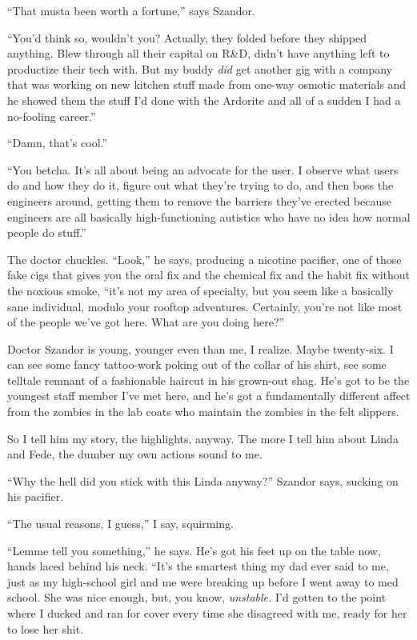 “That musta been worth a fortune,” says Szandor.

“You’d think so, wouldn’t you? Actually, they folded before they
shipped anything. Blew through all their capital on R\&D, didn’t
have anything left to productize their tech with. But my buddy
\emph{did} get another gig with a company that was working on new
kitchen stuff made from one-way osmotic materials and he showed
them the stuff I’d done with the Ardorite and all of a sudden I had
a no-fooling career.”

“Damn, that’s cool.”

“You betcha. It’s all about being an advocate for the user. I
observe what users do and how they do it, figure out what they’re
trying to do, and then boss the engineers around, getting them to
remove the barriers they’ve erected because engineers are all
basically high-functioning autistics who have no idea how normal
people do stuff.”

The doctor chuckles. “Look,” he says, producing a nicotine
pacifier, one of those fake cigs that gives you the oral fix and
the chemical fix and the habit fix without the noxious smoke, “it’s
not my area of specialty, but you seem like a basically sane
individual, modulo your rooftop adventures. Certainly, you’re not
like most of the people we’ve got here. What are you doing here?”

Doctor Szandor is young, younger even than me, I realize. Maybe
twenty-six. I can see some fancy tattoo-work poking out of the
collar of his shirt, see some telltale remnant of a fashionable
haircut in his grown-out shag. He’s got to be the youngest staff
member I’ve met here, and he’s got a fundamentally different affect
from the zombies in the lab coats who maintain the zombies in the
felt slippers.

So I tell him my story, the highlights, anyway. The more I tell him
about Linda and Fede, the dumber my own actions sound to me.

“Why the hell did you stick with this Linda anyway?” Szandor says,
sucking on his pacifier.

“The usual reasons, I guess,” I say, squirming.

“Lemme tell you something,” he says. He’s got his feet up on the
table now, hands laced behind his neck. “It’s the smartest thing my
dad ever said to me, just as my high-school girl and me were
breaking up before I went away to med school. She was nice enough,
but, you know, \emph{unstable.} I’d gotten to the point where I
ducked and ran for cover every time she disagreed with me, ready
for her to lose her shit.

